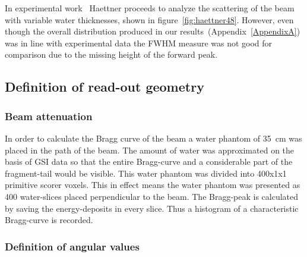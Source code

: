 In experimental work~\cite{ehaettner} Haettner proceeds to analyze the scattering of the beam with variable water thicknesses, shown in figure~\ref{fig:haettner48}. However, even though the overall distribution produced in our results~(Appendix~\ref{AppendixA}) was in line with experimental data the FWHM measure was not good for comparison due to the missing height of the forward peak.


\subsection{Definition of read-out geometry}

\subsubsection{Beam attenuation}

In order to calculate the Bragg curve of the beam a water phantom of 35~cm was placed in the path of the beam. The amount of water was approximated on the basis of GSI data so that the entire Bragg-curve and a considerable part of the fragment-tail would be visible. This water phantom was divided into 400x1x1 primitive scorer voxels. This in effect means the water phantom was presented as 400 water-slices placed perpendicular to the beam. The Bragg-peak is calculated by saving the energy-deposits in every slice. Thus a histogram of a characteristic Bragg-curve is recorded.

\subsubsection{Definition of angular values\label{AngularDistributionText}}

